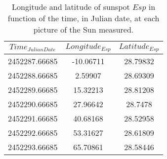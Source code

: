 \begin{table}[H]
	\centering
	\begin{tabular}{ c  c  c }
		\\\hline
		\centering
			$Time_{Julian Date}$ & $Longitude_{Esp}$ & $Latitude_{Esp}$ \\\hline
			2452287.66685 & -10.06711 & 28.79832 \\
			2452288.66685 & 2.59907 & 28.69309 \\
			2452289.66685 & 15.32213 & 28.81208 \\
			2452290.66685 & 27.96642 & 28.7478 \\
			2452291.66685 & 40.68168 & 28.52958 \\
			2452292.66685 & 53.31627 & 28.61809 \\
			2452293.66685 & 65.70861 & 28.58446 \\\hline
	\end{tabular}
	\caption{\label{Tab:sunspotEsp}Longitude and latitude of sunspot $Esp$ in function of the time, in Julian date, at each picture of the Sun measured.}
\end{table}
